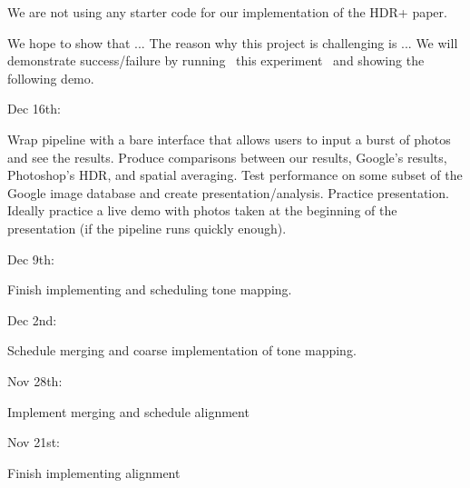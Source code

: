 \documentclass[12pt]{exam}
\newcommand{\sol}[1]{\leavevmode \begin{solution} #1 \end{solution}}
\begin{document}
\begin{questions}

    \sol{
    We are not using any starter code for our implementation of the HDR+ paper.
    }


    \sol{
    
    }


    \sol{
    We hope to show that ... The reason why this project is challenging is ... We will demonstrate success/failure by running ~this experiment~ and showing the following demo.
    }
    
    \sol{
    
    Dec 16th:
    
        \hspace{.2 in} Wrap pipeline with a bare interface that allows users to input a burst of photos and see the results. Produce comparisons between our results, Google's results, Photoshop's HDR, and spatial averaging. Test performance on some subset of the Google image database and create presentation/analysis. Practice presentation. Ideally practice a live demo with photos taken at the beginning of the presentation (if the pipeline runs quickly enough).
    
    Dec 9th:
    
        \hspace{.2 in} Finish implementing and scheduling tone mapping.
    
    Dec 2nd: 

        \hspace{.2 in} Schedule merging and coarse implementation of tone mapping.
    
    Nov 28th:

        \hspace{.2 in} Implement merging and schedule alignment

    Nov 21st: 

        \hspace{.2 in} Finish implementing alignment
        
    }
    
\end{questions}
\end{document}
